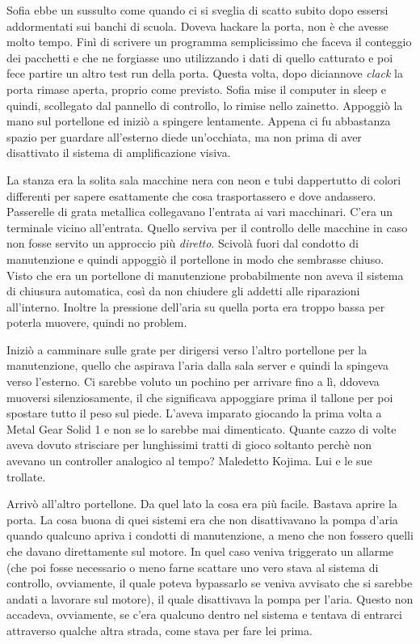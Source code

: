     Sofia ebbe un sussulto come quando ci si sveglia di scatto subito dopo essersi addormentati sui banchi di scuola.
    Doveva hackare la porta, non è che avesse molto tempo. Finì di scrivere un programma semplicissimo che faceva il
    conteggio dei pacchetti e che ne forgiasse uno utilizzando i dati di quello catturato e poi fece partire un altro
    test run della porta. Questa volta, dopo diciannove \emph{clack} la porta rimase aperta, proprio come previsto.
    Sofia mise il computer in sleep e quindi, scollegato dal pannello di controllo, lo rimise nello zainetto. Appoggiò
    la mano sul portellone ed iniziò a spingere lentamente. Appena ci fu abbastanza spazio per guardare all'esterno
    diede un'occhiata, ma non prima di aver disattivato il sistema di amplificazione visiva.

    La stanza era la solita sala macchine nera con neon e tubi dappertutto di colori differenti per sapere esattamente
    che cosa trasportassero e dove andassero. Passerelle di grata metallica collegavano l'entrata ai vari macchinari.
    C'era un terminale vicino all'entrata. Quello serviva per il controllo delle macchine in caso non fosse servito un
    approccio più \emph{diretto}. Scivolà fuori dal condotto di manutenzione e quindi appoggiò il portellone in modo che
    sembrasse chiuso. Visto che era un portellone di manutenzione probabilmente non aveva il sistema di chiusura
    automatica, così da non chiudere gli addetti alle riparazioni all'interno. Inoltre la pressione dell'aria su quella
    porta era troppo bassa per poterla muovere, quindi no problem.

    Iniziò a camminare sulle grate per dirigersi verso l'altro portellone per la manutenzione, quello che aspirava
    l'aria dalla sala server e quindi la spingeva verso l'esterno. Ci sarebbe voluto un pochino per arrivare fino a lì,
    ddoveva muoversi silenziosamente, il che significava appoggiare prima il tallone per poi spostare tutto il peso sul
    piede. L'aveva imparato giocando la prima volta a Metal Gear Solid 1 e non se lo sarebbe mai dimenticato. Quante
    cazzo di volte aveva dovuto strisciare per lunghissimi tratti di gioco soltanto perchè non avevano un controller
    analogico al tempo? Maledetto Kojima. Lui e le sue trollate.

    Arrivò all'altro portellone. Da quel lato la cosa era più facile. Bastava aprire la porta. La cosa buona di quei
    sistemi era che non disattivavano la pompa d'aria quando qualcuno apriva i condotti di manutenzione, a meno che non
    fossero quelli che davano direttamente sul motore. In quel caso veniva triggerato un allarme (che poi fosse
    necessario o meno farne scattare uno vero stava al sistema di controllo, ovviamente, il quale poteva bypassarlo se
    veniva avvisato che si sarebbe andati a lavorare sul motore), il quale disattivava la pompa per l'aria. Questo non
    accadeva, ovviamente, se c'era qualcuno dentro nel sistema e tentava di entrarci attraverso qualche altra strada,
    come stava per fare lei prima.

